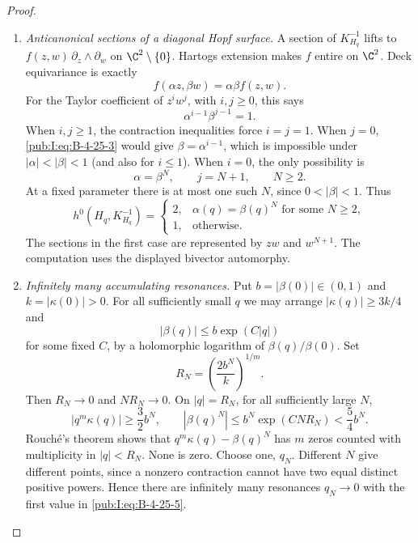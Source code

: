 \begin{proof}
\begin{enumerate}[label=\arabic*.,leftmargin=*]
\item \emph{Anticanonical sections of a diagonal Hopf surface.}
A section of $K_{H_q}^{-1}$ lifts to
$f(z,w)\,\partial_z\wedge\partial_w$ on
$\C^2\setminus\{0\}$. Hartogs extension makes $f$
entire on $\C^2$. Deck equivariance is exactly
\begin{equation}
 f(\alpha z,\beta w)=\alpha\beta f(z,w).
\label{pub:I:eq:B-4-25-2}
\end{equation}
For the Taylor coefficient of $z^i w^j$, with $i,j\ge0$,
this says
\begin{equation}
 \alpha^{i-1}\beta^{j-1}=1.
\label{pub:I:eq:B-4-25-3}
\end{equation}
When $i,j\ge1$, the contraction inequalities force
$i=j=1$. When $j=0$, \eqref{pub:I:eq:B-4-25-3} would give
$\beta=\alpha^{i-1}$, which is impossible under
$|\alpha|<|\beta|<1$ (and also for $i\le1$).
When $i=0$, the only possibility is
\begin{equation}
 \alpha=\beta^N,\qquad j=N+1,\qquad N\ge2.
\label{pub:I:eq:B-4-25-4}
\end{equation}
At a fixed parameter there is at most one such $N$,
since $0<|\beta|<1$. Thus
\begin{equation}
 h^0(H_q,K_{H_q}^{-1})=
 \begin{cases}
 2,&\alpha(q)=\beta(q)^N\text{ for some }N\ge2,\\
 1,&\text{otherwise}.
 \end{cases}
\label{pub:I:eq:B-4-25-5}
\end{equation}
The sections in the first case are represented by
$zw$ and $w^{N+1}$. The computation uses 
the displayed bivector automorphy.

\item \emph{Infinitely many accumulating resonances.}
Put $b=|\beta(0)|\in(0,1)$ and $k=|\kappa(0)|>0$.
For all sufficiently small $q$ we may arrange
$|\kappa(q)|\ge3k/4$ and
\[
 |\beta(q)|\le b\exp(C|q|)
\]
for some fixed $C$, by a holomorphic logarithm of
$\beta(q)/\beta(0)$. Set
\[
 R_N=\left(\frac{2b^N}{k}\right)^{1/m}.
\]
Then $R_N\to0$ and $N R_N\to0$. On $|q|=R_N$, for
all sufficiently large $N$,
\[
 |q^m\kappa(q)|\ge\frac32 b^N,
 \qquad |\beta(q)^N|\le b^N\exp(CN R_N)<\frac54 b^N.
\]
Rouch\'e's theorem shows that
$q^m\kappa(q)-\beta(q)^N$ has $m$ zeros counted with
multiplicity in $|q|<R_N$. None is zero. Choose one,
$q_N$. Different $N$ give different points, since a
nonzero contraction cannot have two equal distinct
positive powers. Hence there are infinitely many
resonances $q_N\to0$ with the first value in
\eqref{pub:I:eq:B-4-25-5}.


\end{enumerate}
\end{proof}
